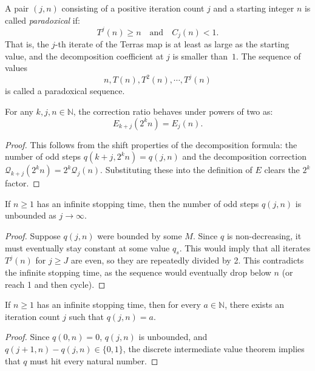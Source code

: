 \begin{definition}\label{def:IsParadoxical}\leanok
A pair $(j, n)$ consisting of a positive iteration count $j$ and a starting integer $n$ is called \emph{paradoxical} if:
\begin{equation}
    T^j(n) \ge n \quad \text{and} \quad C_j(n) < 1.
\end{equation}
That is, the $j$-th iterate of the Terras map is at least as large as the starting value, and the
decomposition coefficient at $j$ is smaller than~$1$.
The sequence of values
\[
n, T(n), T^2(n), \cdots, T^{j}(n)
\]
is called a paradoxical sequence.
\end{definition}

\begin{lemma}\label{lemma:E_shift_mul}\leanok
For any $k, j, n \in \mathbb{N}$, the correction ratio behaves under powers of two as:
\begin{equation}
    E_{k+j}(2^k n) = E_j(n).
\end{equation}
\end{lemma}
\begin{proof}\leanok
This follows from the shift properties of the decomposition formula: the number of odd steps
$q(k+j, 2^k n) = q(j, n)$ and the decomposition correction $\mathcal{Q}_{k+j}(2^k n) = 2^k
\mathcal{Q}_j(n)$. Substituting these into the definition of $E$ clears the $2^k$ factor.
\end{proof}

\begin{lemma}\label{lemma:num_odd_steps_unbounded}\leanok
If $n \ge 1$ has an infinite stopping time, then the number of odd steps $q(j, n)$ is unbounded as $j
\to \infty$.
\end{lemma}
\begin{proof}\leanok
Suppose $q(j, n)$ were bounded by some $M$. Since $q$ is non-decreasing, it must eventually stay
constant at some value $q_s$. This would imply that all iterates $T^j(n)$ for $j \ge J$ are even,
so they are repeatedly divided by 2. This contradicts the infinite stopping time, as the sequence
would eventually drop below $n$ (or reach 1 and then cycle).
\end{proof}

\begin{lemma}\label{lemma:num_odd_steps_hits_all}\leanok
If $n \ge 1$ has an infinite stopping time, then for every $a \in \mathbb{N}$, there exists an
iteration count $j$ such that $q(j, n) = a$.
\end{lemma}
\begin{proof}\leanok
Since $q(0, n) = 0$, $q(j, n)$ is unbounded, and $q(j+1, n) - q(j, n) \in \{0, 1\}$, the discrete
intermediate value theorem implies that $q$ must hit every natural number.
\end{proof}

